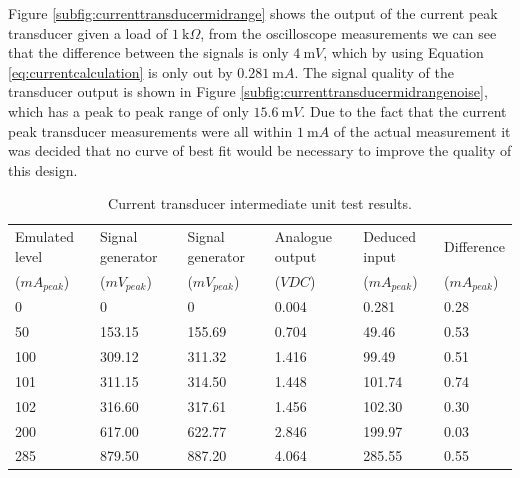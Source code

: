 Figure \ref{subfig:currenttransducermidrange} shows the output of the current peak transducer given a load of  $\SI{1}{\kilo \Omega}$, from the oscilloscope measurements we can see that the difference between the signals is only $\SI{4}{\milli V}$, which by using Equation \ref{eq:currentcalculation} is only out by $\SI{0.281}{\milli A}$. The signal quality of the transducer output is shown in Figure \ref{subfig:currenttransducermidrangenoise}, which has a peak to peak range of only $\SI{15.6}{\milli V}$.\vspace{4mm} \newline Due to the fact that the current peak transducer measurements were all within $\SI{1}{\milli A}$ of the actual measurement it was decided that no curve of best fit would be necessary to improve the quality of this design.

\begin{table}[h]
        \centering
        \scriptsize
        \caption{Current transducer intermediate unit test results.}
             \begin{tabular}{C{2cm} C{2cm} C{2cm} C{2cm} C{2cm} C{2cm}}
           Emulated level & Signal generator & Signal generator & Analogue output & Deduced input & Difference \\
           ($mA_{peak}$)   & ($mV_{peak}$) & ($mV_{peak}$) & ($VDC$)         & ($mA_{peak}$) & ($mA_{peak}$) \\
                  & 0 & 0 & 0.004 & 0.281 & 0.28\\
            50      & 153.15 & 155.69 & 0.704 & 49.46   & 0.53\\
            100     & 309.12 & 311.32 & 1.416 & 99.49   & 0.51\\
            101     & 311.15 & 314.50 & 1.448 & 101.74  & 0.74\\
            102     & 316.60 & 317.61 & 1.456 & 102.30  & 0.30\\
            200     & 617.00 & 622.77 & 2.846 & 199.97  & 0.03\\
            285     & 879.50  & 887.20 & 4.064 & 285.55  & 0.55\\
          \hline
        \end{tabular}
     \label{tab:currenttransducerunittests}
\end{table}

